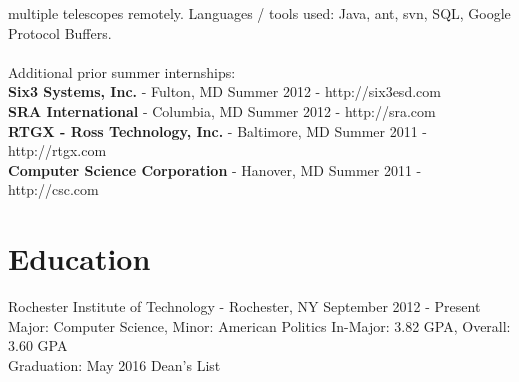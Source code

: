 \documentclass[a4paper,margin,line]{resume}
\newcommand{\rdate}[1]{\hfill {\small #1}}
\begin{document}
\begin{resume}
\begin{asparadesc}
        multiple telescopes remotely. Languages / tools used: Java, ant, svn, SQL,
        Google Protocol Buffers.
        \normalsize
        \\
        \\
        Additional prior summer internships:\\
        \textbf{Six3 Systems, Inc.} - Fulton, MD \hfill Summer 2012 - http://six3esd.com \\
        \textbf{SRA International} - Columbia, MD \hfill Summer 2012 - http://sra.com \\
        \textbf{RTGX - Ross Technology, Inc.} - Baltimore, MD \hfill Summer 2011 - http://rtgx.com \\
        \textbf{Computer Science Corporation} - Hanover, MD \hfill Summer 2011 - http://csc.com
    \end{asparadesc}

\section{\mysidestyle Education}
	\begin{compactdesc}
		\item[Rochester Institute of Technology] - Rochester, NY \rdate{September 2012 - Present} \\
            Major: Computer Science, Minor: American Politics \rdate{In-Major: 3.82 GPA, Overall: 3.60 GPA} \\
            Graduation: May 2016 \rdate{Dean's List}
	\end{compactdesc}


\end{resume}
\end{document}
